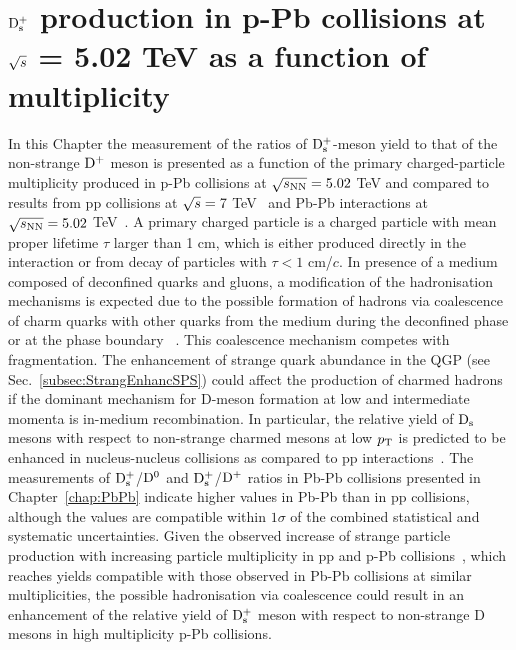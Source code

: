 \chapter{${\rm D_s^+}$ production in p-Pb collisions at $\sqrt{s}$ = 5.02 TeV as a function of multiplicity}
\label{chap:chap6}

In this Chapter the measurement of the ratios of ${\rm D_s^+}$-meson yield to that of the 
non-strange ${\rm D^+}$ meson is presented as a function of the primary
charged-particle multiplicity produced in p-Pb collisions at $\sqrt{s_{\rm NN}}=5.02$ TeV and compared to results from 
pp collisions at $\sqrt{s}=7$ TeV~\cite{Acharya:2017jgo} and Pb-Pb interactions at $\sqrt{s_{\rm NN}}=5.02$ TeV~\cite{ALICE-PUBLIC-2017-003}. 
A primary charged particle is a charged particle with mean proper lifetime $\tau$ larger
than 1 cm, which is either produced directly in the interaction or from decay of particles
with $\tau < 1$ cm/$c$. In presence of a medium 
composed of deconfined quarks and gluons, a modification of the hadronisation 
mechanisms is expected due to the possible formation of hadrons via
coalescence of charm quarks with other quarks from the 
medium during the deconfined phase or at the phase boundary
~\cite{Greco:2003mm,Greco:2003vf, Andronic:2007zu, He:2012df}. This coalescence mechanism competes with
fragmentation. The enhancement of strange quark abundance in the QGP 
(see Sec.~\ref{subsec:StrangEnhancSPS}) could affect the production of charmed hadrons if 
the dominant mechanism for D-meson formation at low and 
intermediate momenta is in-medium recombination. 
In particular, the relative yield of ${\rm D_s}$ 
mesons with respect to non-strange charmed mesons at low $p_{\rm T}$ is 
predicted to be enhanced in nucleus-nucleus collisions as compared to pp 
interactions~\cite{Andronic2003,RafelskiKuznetsova,HeFriesRapp}.
The measurements of ${\rm D_s^+}$/${\rm D^0}$ and ${\rm D_s^+}$/${\rm D^+}$ ratios in Pb-Pb collisions presented in 
Chapter~\ref{chap:PbPb} indicate higher values in Pb-Pb than in pp collisions, although
the values are compatible within $1\sigma$ of the combined statistical and systematic uncertainties.
Given the observed increase of strange particle production with increasing particle multiplicity
in pp and p-Pb collisions~\cite{Abelev:2013haa,Adam:2015vsf,ALICE:2017jyt}, which reaches
yields compatible with those observed in Pb-Pb collisions at similar multiplicities, the possible 
hadronisation via coalescence could result in an enhancement 
of the relative yield of ${\rm D_s^+}$ meson with respect to non-strange
D mesons in high multiplicity p-Pb collisions.


